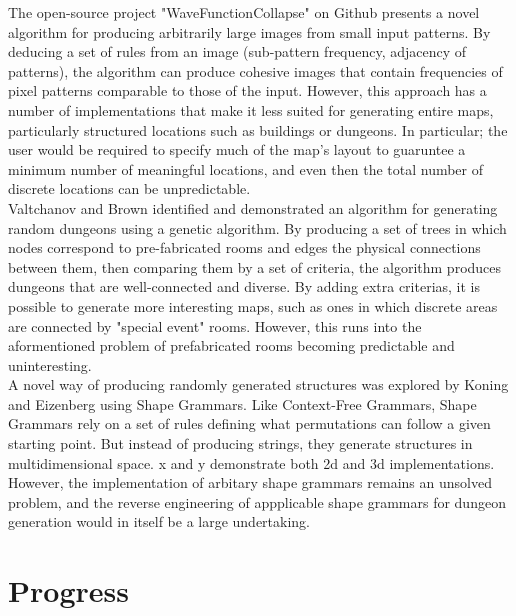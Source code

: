 \documentclass{article}
\begin{document}
The open-source project "WaveFunctionCollapse" on Github presents a novel algorithm for producing arbitrarily large images from small input patterns.\cite{wfc-report} By deducing a set of rules from an image (sub-pattern frequency, adjacency of patterns), the algorithm can produce cohesive images that contain frequencies of pixel patterns comparable to those of the input. However, this approach has a number of implementations that make it less suited for generating entire maps, particularly structured locations such as buildings or dungeons. In particular; the user would be required to specify much of the map's layout to guaruntee a minimum number of meaningful locations, and even then the total number of discrete locations can be unpredictable.\\



Valtchanov and Brown identified and demonstrated an algorithm for generating random dungeons using a genetic algorithm\cite{genetic}. By producing a set of trees in which nodes correspond to pre-fabricated rooms and edges the physical connections between them, then comparing them by a set of criteria, the algorithm produces dungeons that are well-connected and diverse. By adding extra criterias, it is possible to generate more interesting maps, such as ones in which discrete areas are connected by "special event" rooms. However, this runs into the aformentioned problem of prefabricated rooms becoming predictable and uninteresting.\\



A novel way of producing randomly generated structures was explored by Koning and Eizenberg using Shape Grammars.\cite{koning1981language} Like Context-Free Grammars, Shape Grammars rely on a set of rules defining what permutations can follow a given starting point. But instead of producing strings, they generate structures in multidimensional space. x and y demonstrate both 2d and 3d implementations. However, the implementation of arbitary shape grammars remains an unsolved problem, and the reverse engineering of appplicable shape grammars for dungeon generation would in itself be a large undertaking.

\section{Progress}
\end{document}
